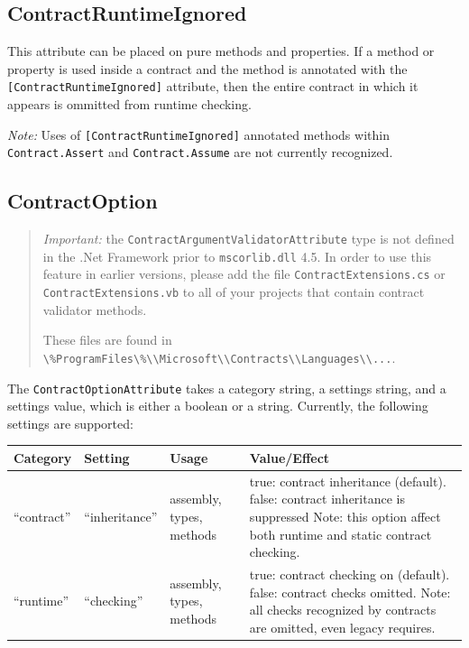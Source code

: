 \documentclass{article}
\newcommand{\code}[1]{\lstinline{#1}}
\begin{document}
\subsection{ContractRuntimeIgnored}
This attribute can be placed on pure methods and properties. If a
method or property is used inside a contract and the method is
annotated with the \code{[ContractRuntimeIgnored]} attribute, then the
entire contract in which it appears is ommitted from runtime
checking.

\emph{Note:} Uses of \code{[ContractRuntimeIgnored]} annotated methods within
\code{Contract.Assert} and \code{Contract.Assume} are not currently
recognized.

\subsection{ContractOption}
\label{sec:contractoption}

\begin{quote}
\emph{Important:} the \code{ContractArgumentValidatorAttribute} type
is not defined in the .Net Framework prior to \code{mscorlib.dll} 4.5. In order to use this
feature in earlier versions, please add the file \code{ContractExtensions.cs} or
\code{ContractExtensions.vb} to all of your projects that contain
contract validator methods.

\noindent These files are found in \code{\%ProgramFiles\%\\Microsoft\\Contracts\\Languages\\...}.
\end{quote}

\noindent 
The \code{ContractOptionAttribute} takes a category string, a settings
string, and a settings value, which is either a boolean or a
string. Currently, the following settings are supported:
\begin{center}
\begin{tabular}{|lllp{2.5in}|}
\hline
Category & Setting & Usage & Value/Effect \\
\hline
``contract'' & ``inheritance'' & assembly, types, methods & true:
contract inheritance (default).
\newline false: contract inheritance is suppressed
\newline Note: this option affect both runtime and static contract checking.
\\
\hline
``runtime'' & ``checking'' & assembly, types, methods & true: contract
checking on (default).
\newline false: contract checks omitted.
\newline Note: all checks recognized by contracts are omitted, even
legacy requires.
\\
\hline
\end{tabular}
\end{center}
\end{document}
